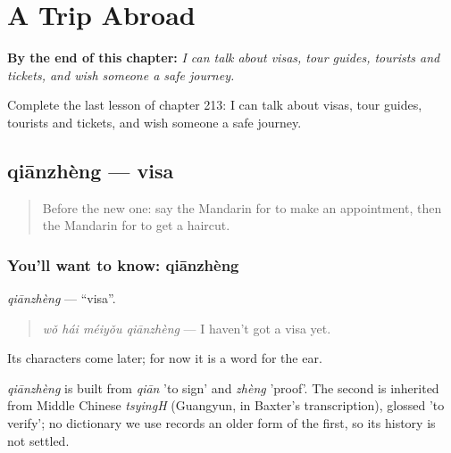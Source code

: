 
\chapter{A Trip Abroad}
\label{ch:zh-a-trip-abroad}

\begin{chapteropening}
\textbf{By the end of this chapter:} \emph{I can talk about visas, tour guides, tourists and tickets, and wish someone a safe journey.}

Complete the last lesson of chapter 213: I can talk about visas, tour guides, tourists and tickets, and wish someone a safe journey.
\end{chapteropening}

\section[qiānzhèng]{qiānzhèng — visa}

\label{lesson:ZH-C213-qianzheng}



\begin{quote}
Before the new one: say the Mandarin for to make an appointment, then the Mandarin for to get a haircut.
\end{quote}

\subsection*{You'll want to know: qiānzhèng}
\emph{qiānzhèng} — \textquotedblleft{}visa\textquotedblright{}.

\begin{quote}
\emph{wǒ hái méiyǒu qiānzhèng} — I haven't got a visa yet.
\end{quote}

Its characters come later; for now it is a word for the ear.

\begin{cousinweb}
\emph{qiānzhèng} is built from \emph{qiān} 'to sign' and \emph{zhèng} 'proof'. The second is inherited from Middle Chinese \emph{tsyingH} (Guangyun, in Baxter's transcription), glossed 'to verify'; no dictionary we use records an older form of the first, so its history is not settled.
\end{cousinweb}

